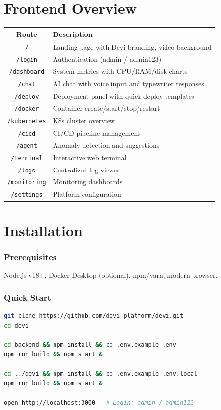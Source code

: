 \documentclass[12pt,a4paper]{report}
\begin{document}
\chapter{Frontend Overview}

\begin{table}[H]
\centering
\small
\begin{tabularx}{\textwidth}{c X}
\toprule
\textbf{Route} & \textbf{Description} \\
\midrule
\texttt{/} & Landing page with Devi branding, video background \\
\texttt{/login} & Authentication (admin / admin123) \\
\texttt{/dashboard} & System metrics with CPU/RAM/disk charts \\
\texttt{/chat} & AI chat with voice input and typewriter responses \\
\texttt{/deploy} & Deployment panel with quick-deploy templates \\
\texttt{/docker} & Container create/start/stop/restart \\
\texttt{/kubernetes} & K8s cluster overview \\
\texttt{/cicd} & CI/CD pipeline management \\
\texttt{/agent} & Anomaly detection and suggestions \\
\texttt{/terminal} & Interactive web terminal \\
\texttt{/logs} & Centralized log viewer \\
\texttt{/monitoring} & Monitoring dashboards \\
\texttt{/settings} & Platform configuration \\
\bottomrule
\end{tabularx}
\end{table}

\chapter{Installation}

\subsection*{Prerequisites}
Node.js v18+, Docker Desktop (optional), npm/yarn, modern browser.

\subsection*{Quick Start}
\begin{lstlisting}[language=bash]
git clone https://github.com/devi-platform/devi.git
cd devi

cd backend && npm install && cp .env.example .env
npm run build && npm start &

cd ../devi && npm install && cp .env.example .env.local
npm run build && npm start &

open http://localhost:3000   # Login: admin / admin123
\end{lstlisting}
\end{document}
